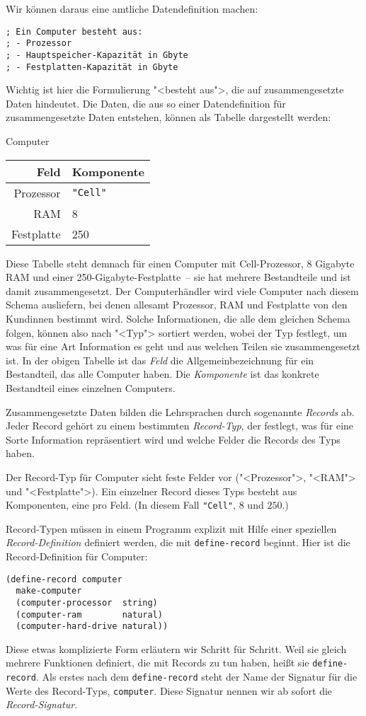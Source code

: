 Wir können daraus eine amtliche Datendefinition machen:
%
\begin{lstlisting}
; Ein Computer besteht aus:
; - Prozessor
; - Hauptspeicher-Kapazität in Gbyte
; - Festplatten-Kapazität in Gbyte
\end{lstlisting}
%
Wichtig ist hier die Formulierung "<besteht aus">, die auf
zusammengesetzte Daten hindeutet.  Die Daten, die aus so einer
Datendefinition für zusammengesetzte Daten entstehen, können als
Tabelle dargestellt werden:
%
\begin{center}
  Computer\qquad
  \begin{tabular}[c]{r|l}
    \textbf{Feld} & \textbf{Komponente}\\\hline
     Prozessor & \verb|"Cell"|\\
     RAM & 8\\
    Festplatte & 250
  \end{tabular}
\end{center}
%
Diese Tabelle steht demnach für einen Computer mit Cell-Prozessor, 8
Gigabyte RAM und einer 250-Gigabyte-Festplatte~-- sie hat mehrere
Bestandteile und ist damit zusammengesetzt.  Der Computerhändler wird
viele Computer nach diesem Schema ausliefern, bei denen allesamt
Prozessor, RAM und Festplatte von den Kundinnen bestimmt wird.  Solche
Informationen, die alle dem gleichen Schema folgen, können also nach
"<Typ"> sortiert werden, wobei der Typ
festlegt, um was für eine Art Information es geht und aus welchen
Teilen sie zusammengesetzt ist.  In der obigen Tabelle ist das
\textit{Feld} die Allgemeinbezeichnung für ein Bestandteil, das
alle Computer haben.  Die \textit{Komponente} ist das konkrete
Bestandteil eines einzelnen Computers.

Zusammengesetzte Daten bilden die Lehrsprachen durch
sogenannte \textit{Records} ab.  Jeder Record gehört
zu einem bestimmten
\textit{Record-Typ}, der festlegt, was für eine
Sorte Information repräsentiert wird und welche Felder die Records
des Typs haben.

Der Record-Typ für Computer sieht feste Felder
vor ("<Prozessor">, "<RAM"> und "<Festplatte">).  Ein einzelner Record
dieses Typs besteht aus Komponenten, eine pro
Feld. (In diesem Fall \lstinline{"Cell"}, $8$ und $250$.)

Record-Typen müssen in einem Programm explizit mit Hilfe einer
speziellen \textit{Record-Definition} definiert werden, die mit
\lstinline{define-record} beginnt.  Hier ist die
Record-Definition für
Computer:
%
\begin{lstlisting}
(define-record computer
  make-computer
  (computer-processor  string)
  (computer-ram        natural)
  (computer-hard-drive natural))
\end{lstlisting}
%
Diese etwas komplizierte Form erläutern wir Schritt für Schritt.  Weil sie gleich mehrere
Funktionen definiert, die mit Records zu tun haben, heißt
sie \lstinline{define-record}.  Als erstes nach
dem \lstinline{define-record} steht der Name der Signatur für
die Werte des Record-Typs,
\lstinline{computer}.  Diese Signatur nennen wir ab sofort die
\textit{Record-Signatur}.

